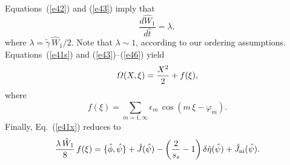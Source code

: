 \documentclass[12pt,prb,aps]{revtex4-1}
\begin{document}
Equations~(\ref{e42}) and (\ref{e43}) imply that
\begin{equation}\label{e47}
\frac{d\hat{W}_1}{d\hat{t}} = \lambda,
\end{equation}
where 
$\lambda = \tilde{\gamma}\,\hat{W}_1/2$. 
Note that $\lambda\sim 1$, according to our ordering assumptions. Equations~(\ref{e41s}) and (\ref{e43})--(\ref{e46})
yield
\begin{equation}\label{e50}
{\mit\Omega}(X,\xi) = \frac{X^2}{2}+f(\xi),
\end{equation}
where
\begin{equation}
f(\xi) = \sum_{m=1,\infty} \epsilon_m\,\cos(m\,\xi-\varphi_m).
\end{equation}
Finally, Eq.~(\ref{e41x}) reduces to 
\begin{equation}\label{e51}
\frac{\lambda\,\hat{W}_1}{8}\,f(\xi)= \{\skew{3}\hat{\phi},\hat{\psi}\}+\hat{J}(\hat{\psi})-\left(\frac{2}{s_s}-1\right)\delta\hat{\eta}(\hat{\psi})+\hat{J}_{\rm ni}(\hat{\psi}).
\end{equation}
\end{document}

